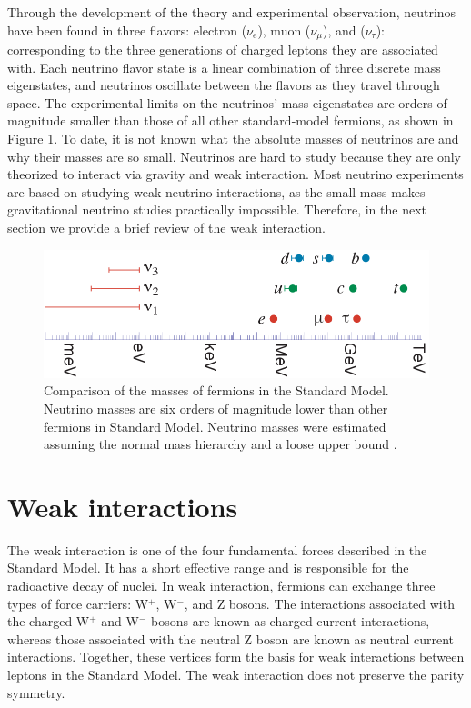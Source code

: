 Through the development of the theory and experimental observation, neutrinos have been found in three flavors: electron ($\nu_e$), muon ($\nu_{\mu}$), and ($\nu_{\tau}$): corresponding to the three generations of charged leptons they are associated with. Each neutrino flavor state is a linear combination of three discrete mass eigenstates, and neutrinos oscillate between the flavors as they travel through space. The experimental limits on the neutrinos' mass eigenstates are orders of magnitude smaller than those of all other standard-model fermions, as shown in Figure \ref{n_mass_comp}. To date, it is not known what the absolute masses of neutrinos are and why their masses are so small. Neutrinos are hard to study because they are only theorized to interact via gravity and weak interaction. Most neutrino experiments are based on studying weak neutrino interactions, as the small mass makes gravitational neutrino studies practically impossible. Therefore, in the next section we provide a brief review of the weak interaction.

\vspace{0.3cm}
\begin{figure}[!htb]
\centering
\includegraphics[width=0.85\linewidth]{ch1/figs/n_mass_comp.png}
\vspace{0.3cm}
\caption{Comparison of the masses of fermions in the Standard Model. Neutrino masses are six orders of magnitude lower than other fermions in Standard Model. Neutrino masses were estimated assuming the normal mass hierarchy and a loose upper bound \cite{Hewett:2012ns}.}
\label{n_mass_comp}
\end{figure}

\section{Weak interactions}
The weak interaction is one of the four fundamental forces described in the Standard Model. It has a short effective range and is responsible for the radioactive decay of nuclei. In weak interaction, fermions can exchange three types of force carriers: W$^+$, W$^-$, and Z bosons. The interactions associated with the charged W$^+$ and W$^-$ bosons are known as charged current interactions, whereas those associated with the neutral Z boson are known as neutral current interactions. Together, these vertices form the basis for weak interactions between leptons in the Standard Model. The weak interaction does not preserve the parity symmetry.\cite{wu_experiment}


